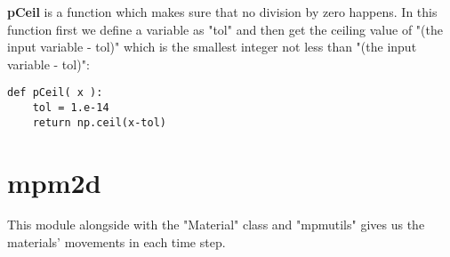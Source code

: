 \textbf{pCeil} is a function which makes sure that no division by zero happens. In this function first we define a variable as "tol" and then get the ceiling value of "(the input variable - tol)" which is the smallest integer not less than "(the input variable - tol)":
\begin{lstlisting}
def pCeil( x ):
    tol = 1.e-14
    return np.ceil(x-tol)
\end{lstlisting}



\chapter{mpm2d}
\label{chap:mpm2d}

This module alongside with the "Material" class and "mpmutils" gives us the materials' movements in each time step.

